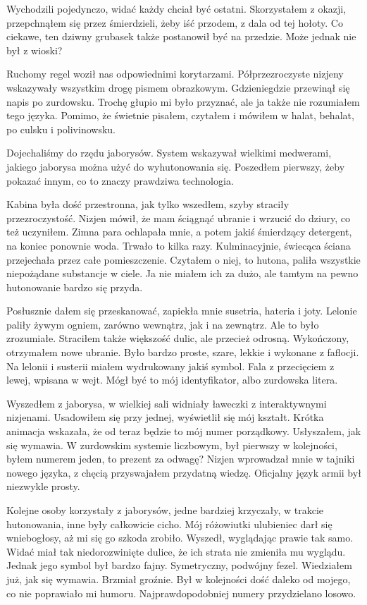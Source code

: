 Wychodzili pojedynczo, widać każdy chciał być ostatni.
Skorzystałem z okazji, przepchnąłem się przez śmierdzieli, żeby iść przodem, z dala od tej hołoty.
Co ciekawe, ten dziwny grubasek także postanowił być na przedzie. Może jednak nie był z wioski?

Ruchomy regel woził nas odpowiednimi korytarzami.
Półprzezroczyste nizjeny wskazywały wszystkim drogę pismem obrazkowym.
Gdzieniegdzie przewinął się napis po zurdowsku.
Trochę głupio mi było przyznać, ale ja także nie rozumiałem tego języka. 
Pomimo, że świetnie pisałem, czytałem i mówiłem w halat, behalat, po culsku i polivinowsku.

Dojechaliśmy do rzędu jaborysów. System wskazywał wielkimi medwerami, jakiego jaborysa można użyć do wyhutonowania się.
Poszedłem pierwszy, żeby pokazać innym, co to znaczy prawdziwa technologia.

Kabina była dość przestronna, jak tylko wszedłem, szyby straciły przezroczystość.
Nizjen mówił, że mam ściągnąć ubranie i wrzucić do dziury, co też uczyniłem.
Zimna para ochlapała mnie, a potem jakiś śmierdzący detergent, na koniec ponownie woda.
Trwało to kilka razy.
Kulminacyjnie, świecąca ściana przejechała przez całe pomieszczenie.
Czytałem o niej, to hutona, paliła wszystkie niepożądane substancje w ciele.
Ja nie miałem ich za dużo, ale tamtym na pewno hutonowanie bardzo się przyda.

Posłusznie dałem się przeskanować, zapiekła mnie susetria, hateria i joty.
Lelonie paliły żywym ogniem, zarówno wewnątrz, jak i na zewnątrz. Ale to było zrozumiałe.
Straciłem także większość dulic, ale przecież odrosną.
Wykończony, otrzymałem nowe ubranie.
Było bardzo proste, szare, lekkie i wykonane z faflocji.
Na lelonii i susterii miałem wydrukowany jakiś symbol. 
Fala z przecięciem z lewej, wpisana w wejt.
Mógł być to mój identyfikator, albo zurdowska litera.

Wyszedłem z jaborysa, w wielkiej sali widniały ławeczki z interaktywnymi nizjenami.
Usadowiłem się przy jednej, wyświetlił się mój kształt.
Krótka animacja wskazała, że od teraz będzie to mój numer porządkowy.
Usłyszałem, jak się wymawia. 
W zurdowskim systemie liczbowym, był pierwszy w kolejności, byłem numerem jeden, to prezent za odwagę?
Nizjen wprowadzał mnie w tajniki nowego języka, z chęcią przyswajałem przydatną wiedzę.
Oficjalny język armii był niezwykle prosty.

Kolejne osoby korzystały z jaborysów, jedne bardziej krzyczały, w trakcie hutonowania, inne były całkowicie cicho.
Mój różowiutki ulubieniec darł się wniebogłosy, aż mi się go szkoda zrobiło.
Wyszedł, wyglądając prawie tak samo. Widać miał tak niedorozwinięte dulice, że ich strata nie zmieniła mu wyglądu.
Jednak jego symbol był bardzo fajny. Symetryczny, podwójny fezel.
Wiedziałem już, jak się wymawia. Brzmiał groźnie.
Był w kolejności dość daleko od mojego, co nie poprawiało mi humoru.
Najprawdopodobniej numery przydzielano losowo.

